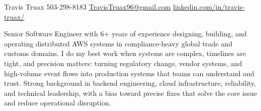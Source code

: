 \documentclass[10pt]{article}
\begin{document}
\titlebar
  {Travis Truax}
  {503-298-8183 \textbar{} \href{mailto:TravisTruax96@gmail.com}{TravisTruax96@gmail.com} \textbar{} \href{https://linkedin.com/in/travis-truax/}{linkedin.com/in/travis-truax/}}

Senior Software Engineer with 6+ years of experience designing, building, and operating distributed AWS systems in compliance-heavy global trade and customs domains. I do my best work when systems are complex, timelines are tight, and precision matters: turning regulatory change, vendor systems, and high-volume event flows into production systems that teams can understand and trust. Strong background in backend engineering, cloud infrastructure, reliability, and technical leadership, with a bias toward precise fixes that solve the core issue and reduce operational disruption.

\end{document}
